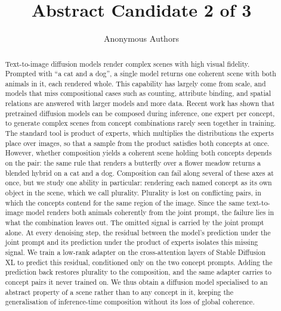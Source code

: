 \documentclass{article}
\title{Abstract Candidate 2 of 3}
\author{Anonymous Authors}
\begin{document}
\maketitle

\begin{abstract}
Text-to-image diffusion models render complex scenes with high visual fidelity. Prompted with ``a cat and a dog'', a single model returns one coherent scene with both animals in it, each rendered whole. This capability has largely come from scale, and models that miss compositional cases such as counting, attribute binding, and spatial relations are answered with larger models and more data. Recent work has shown that pretrained diffusion models can be composed during inference, one expert per concept, to generate complex scenes from concept combinations rarely seen together in training. The standard tool is product of experts, which multiplies the distributions the experts place over images, so that a sample from the product satisfies both concepts at once. However, whether composition yields a coherent scene holding both concepts depends on the pair: the same rule that renders a butterfly over a flower meadow returns a blended hybrid on a cat and a dog. Composition can fail along several of these axes at once, but we study one ability in particular: rendering each named concept as its own object in the scene, which we call plurality. Plurality is lost on conflicting pairs, in which the concepts contend for the same region of the image. Since the same text-to-image model renders both animals coherently from the joint prompt, the failure lies in what the combination leaves out. The omitted signal is carried by the joint prompt alone. At every denoising step, the residual between the model's prediction under the joint prompt and its prediction under the product of experts isolates this missing signal. We train a low-rank adapter on the cross-attention layers of Stable Diffusion XL to predict this residual, conditioned only on the two concept prompts. Adding the prediction back restores plurality to the composition, and the same adapter carries to concept pairs it never trained on. We thus obtain a diffusion model specialised to an abstract property of a scene rather than to any concept in it, keeping the generalisation of inference-time composition without its loss of global coherence.
\end{abstract}
\end{document}
